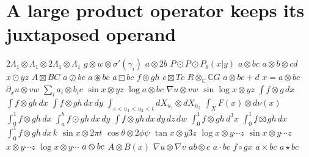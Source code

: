 \documentclass{article}
\begin{document}
\section{A large product operator keeps its juxtaposed operand}
$2\Lambda_1\otimes\Lambda_1\otimes 2\Lambda_1\otimes\Lambda_1$ $g\otimes w\otimes\sigma'(\gamma_i)$ $a\otimes 2b$ $P\odot P\odot P_\theta(x|y)$
$a\otimes b c$ $a\otimes b\otimes c d$ $x\odot y z$ $A\boxtimes B C$ $a\oslash b c$ $a\circledast b c$ $a\boxdot b c$ $f\circledcirc g h$
$c\boxtimes T c$ $R\otimes_{\mathbb C}\mathbb C G$ $a\otimes b c+d$ $x=a\otimes b c$ $\partial_x u\otimes v w$ $\sum_i a_i\otimes b_i c$
$\sin x\otimes y z$ $\log a\otimes b c$ $\nabla u\otimes v w$ $\sin\log x\otimes y z$
$\int f\otimes g\,dx$ $\int f\otimes g h\,dx$ $\int f\otimes g h\,dx\,dy$ $\int_{s<u_1<u_2<t}dX_{u_1}\otimes dX_{u_2}$ $\int_X F(x)\otimes d\nu(x)$
$\int_0^1 f\otimes g h\,dx$ $\int_a^b f\odot g h\,dx\,dy$ $\int f\otimes g h\,dx\,dy\,dz\,dw$ $\int_0^1 f\otimes g h\,d^3x$
$\int_0^1 f\boxtimes g h\,dx$ $\int_0^1 f\otimes g h\,dx\,k$ $\sin x\otimes 2\pi t$ $\cos\theta\otimes 2\phi\psi$ $\tan x\otimes y3z$
$\log x\otimes y\cdots z$ $\sin x\otimes y\cdots z$ $x\otimes y\cdots z$ $\log x\otimes y\cdots$ $a\varobslash b c$
$A\otimes B(x)$ $\nabla u\otimes\nabla v$ $a b\otimes c$ $a\cdot b c$ $f\circ g x$ $a\times b c$ $a\star b c$
\end{document}
